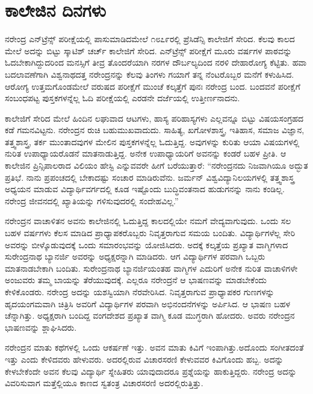 
\chapter{ಕಾಲೇಜಿನ ದಿನಗಳು}

ನರೇಂದ್ರ ಎನ್‍ಟ್ರೆನ್ಸ್ ಪರೀಕ್ಷೆಯಲ್ಲಿ ಪಾಸುಮಾಡಿದಮೇಲೆ ೧೮೭೯ರಲ್ಲಿ ಪ್ರೆಸಿಡೆನ್ಸಿ ಕಾಲೇಜಿಗೆ ಸೇರಿದ. ಕೆಲವು ಕಾಲದ ಮೇಲೆ ಅದನ್ನು ಬಿಟ್ಟು ಸ್ಕಾಟಿಶ್ ಚರ್ಚ್ ಕಾಲೇಜಿಗೆ ಸೇರಿದ. ಎನ್‍ಟ್ರೆನ್ಸ್ ಪರೀಕ್ಷೆಗೆ ಮೂರು ವರ್ಷಗಳ ಪಾಠವನ್ನು ಓದಬೇಕಾಗಿದ್ದುದರಿಂದ ಮನಸ್ಸಿಗೆ ತೀವ್ರ ತೊಂದರೆಯಾಗಿ ನರಗಳ ದೌರ್ಬಲ್ಯದಿಂದ ನರಳಿ ದೇಹಾರೋಗ್ಯ ಕೆಟ್ಟಿತು. ಹವಾ ಬದಲಾವಣೆಗಾಗಿ ವಿಶ್ವನಾಥದತ್ತ ನರೇಂದ್ರನನ್ನು ಕೆಲವು ತಿಂಗಳು ಗಯಾಗೆ ತನ್ನ ನೆಂಟರೊಬ್ಬರ ಮನೆಗೆ ಕಳುಹಿಸಿದ. ಆರೋಗ್ಯ ಉತ್ತಮಗೊಂಡಮೇಲೆ ವರುಷದ ಪರೀಕ್ಷೆಗೆ ಮುಂಚೆ ಕಲ್ಕತ್ತೆಗೆ ಪುನಃ ನರೇಂದ್ರ ಬಂದ. ಬಂದವನೆ ಪರೀಕ್ಷೆಗೆ ಸಂಬಂಧಪಟ್ಟ ಪುಸ್ತಕಗಳನ್ನೆಲ್ಲ ಓದಿ ಪರೀಕ್ಷೆಯಲ್ಲಿ ಎರಡನೇ ದರ್ಜೆಯಲ್ಲಿ ಉತ್ತೀರ್ಣನಾದನು.

ಕಾಲೇಜಿಗೆ ಸೇರಿದ ಮೇಲೆ ಹಿಂದಿನ ಲಘುವಾದ ಆಟಗಳು, ಹಾಸ್ಯ ಪರಿಹಾಸ್ಯಗಳು ಎಲ್ಲವನ್ನೂ ಬಿಟ್ಟು ವಿಷಯಸಂಗ್ರಹದ ಕಡೆ ಗಮನವಿಟ್ಟನು. ನರೇಂದ್ರನ ರುಚಿ ಬಹುಮುಖವಾದುದು. ಸಾಹಿತ್ಯ, ಖಗೋಳಶಾಸ್ತ್ರ, ಇತಿಹಾಸ, ಸಮಾಜ ವಿಜ್ಞಾನ, ತತ್ತ್ವಶಾಸ್ತ್ರ, ತರ್ಕ ಮುಂತಾದವುಗಳ ಮೇಲಿನ ಪುಸ್ತಕಗಳನ್ನೆಲ್ಲ ಓದುತ್ತಿದ್ದ. ಅವುಗಳನ್ನು ಕುರಿತು ಆಯಾ ವಿಷಯಗಳಲ್ಲಿ ನುರಿತ ಉಪಾಧ್ಯಾಯರೊಡನೆ ಮಾತನಾಡುತ್ತಿದ್ದ. ಅನೇಕ ಉಪಾಧ್ಯಾಯರಿಗೆ ಅವನನ್ನು ಕಂಡರೆ ಬಹಳ ಪ್ರೀತಿ. ಆ ಕಾಲೇಜಿನ ಪ್ರಿನ್ಸಿಪಾಲರಾದ ವಿಲಿಯಂ ಹೇಸ್ಟಿ ಎನ್ನುವವರೇ ಹೀಗೆ ಬರೆಯುತ್ತಾರೆ: “ನರೇಂದ್ರನದು ನಿಜವಾಗಿಯೂ ಅದ್ಭುತ ಪ್ರತಿಭೆ. ನಾನು ಪ್ರಪಂಚದಲ್ಲಿ ಬೇಕಾದಷ್ಟು ಸಂಚಾರ ಮಾಡಿರುವೆನು. ಜರ್ಮನ್ ವಿಶ್ವವಿದ್ಯಾನಿಲಯಗಳಲ್ಲಿ ತತ್ತ್ವಶಾಸ್ತ್ರ ಅಧ್ಯಯನ ಮಾಡುವ ವಿದ್ಯಾರ್ಥಿವರ್ಗದಲ್ಲಿ ಕೂಡ ಇಷ್ಟೊಂದು ಬುದ್ಧಿವಂತನಾದ ಹುಡುಗನನ್ನು ನಾನು ಕಂಡಿಲ್ಲ. ನರೇಂದ್ರ ಜೀವನದಲ್ಲಿ ಖ್ಯಾತಿಯನ್ನು ಗಳಿಸುವುದರಲ್ಲಿ ಸಂದೇಹವಿಲ್ಲ.”

ನರೇಂದ್ರನ ವಾಚಾಳಿತನ ಅವನು ಕಾಲೇಜಿನಲ್ಲಿ ಓದುತ್ತಿದ್ದ ಕಾಲದಲ್ಲಿಯೇ ನಮಗೆ ವೇದ್ಯವಾಗುವುದು. ಒಂದು ಸಲ ಬಹಳ ವರ್ಷಗಳು ಕೆಲಸ ಮಾಡಿದ ಪ್ರಾಧ್ಯಾಪಕರೊಬ್ಬರು ನಿವೃತ್ತರಾಗುವ ಸಮಯ ಬಂದಿತು. ವಿದ್ಯಾರ್ಥಿಗಳೆಲ್ಲ ಸೇರಿ ಅವರನ್ನು ಬೀಳ್ಕೊಡುವುದಕ್ಕೆ ಒಂದು ಸಮಾರಂಭವನ್ನು ಯೋಜಿಸಿದರು. ಅದಕ್ಕೆ ಕಲ್ಕತ್ತೆಯ ಪ್ರಖ್ಯಾತ ವಾಗ್ಮಿಗಳಾದ ಸುರೇಂದ್ರನಾಥ ಬ್ಯಾನರ್ಜಿ ಅವರನ್ನು ಅಧ್ಯಕ್ಷರನ್ನಾಗಿ ಮಾಡಿದರು. ಆಗ ವಿದ್ಯಾರ್ಥಿಗಳ ಪರವಾಗಿ ಒಬ್ಬರು ಮಾತನಾಡಬೇಕಾಗಿ ಬಂದಿತು. ಸುರೇಂದ್ರನಾಥ ಬ್ಯಾನರ್ಜಿಯಂತಹ ವಾಗ್ಮಿಗಳ ಎದುರಿಗೆ ಅನೇಕ ನುರಿತ ವಾಚಾಳಿಗಳೇ ಅಂಜುವರು ತಮ್ಮ ಬಾಯನ್ನು ತೆರೆಯುವುದಕ್ಕೆ. ಎಲ್ಲರೂ ನರೇಂದ್ರನೆ ಆ ಭಾಷಣವನ್ನು ಮಾಡಬೇಕೆಂದು ಕೇಳಿಕೊಂಡರು. ನರೇಂದ್ರ ಅದನ್ನು ಯಶಸ್ವಿಯಾಗಿ ನೆರವೇರಿಸಿದ. ನಿವೃತ್ತರಾಗುವ ಪ್ರಾಧ್ಯಾಪಕರ ಗುಣಗಳನ್ನು ಹೃದಯಂಗಮವಾಗಿ ಚಿತ್ರಿಸಿ ಅವರಿಗೆ ವಿದ್ಯಾರ್ಥಿಗಳ ಪರವಾಗಿ ಅಭಿನಂದನೆಗಳನ್ನು ಅರ್ಪಿಸಿದ. ಆ ಭಾಷಣ ಬಹಳ ಚೆನ್ನಾಗಿತ್ತು. ಅಧ್ಯಕ್ಷರಾಗಿ ಬಂದಿದ್ದ ವಂಗದೇಶದ ಪ್ರಖ್ಯಾತ ವಾಗ್ಮಿ ಕೂಡ ಮುಗ್ಧರಾಗಿ ಹೋದರು. ಅವರು ನರೇಂದ್ರನ ಭಾಷಣವನ್ನು ಶ್ಲಾಘಿಸಿದರು.

ನರೇಂದ್ರನ ಮಾತು ಕಥೆಗಳಲ್ಲಿ ಒಂದು ಆಕರ್ಷಣೆ ಇತ್ತು. ಅವನ ಮಾತು ಕಿವಿಗೆ ಇಂಪಾಗಿತ್ತು.ಅದೊಂದು ಸಂಗೀತದಂತೆ ಇತ್ತು ಎಂದು ಕೇಳಿದವರು ಹೇಳುವರು. ಅದರಲ್ಲಿರುವ ವಿಚಾರಸರಣಿ ಕೇಳುವವರ ಕಿವಿಗೊಂದು ಹಬ್ಬ. ಅದನ್ನು ಕೇಳಬೇಕೆಂದೇ ಅವನ ಕೆಲವು ವಿದ್ಯಾರ್ಥಿ ಸ್ನೇಹಿತರು ಯಾವುದಾದರೂ ಪ್ರಶ್ನೆಯನ್ನು ಹಾಕುತ್ತಿದ್ದರು. ನರೇಂದ್ರ ಅದನ್ನು ವಿವರಿಸುವಾಗ ಮತ್ತೆಲ್ಲಿಯೂ ಕಾಣದ ಸ್ವತಂತ್ರ ವಿಚಾರಸರಣಿ ಅದರಲ್ಲಿರುತ್ತಿತ್ತು.

